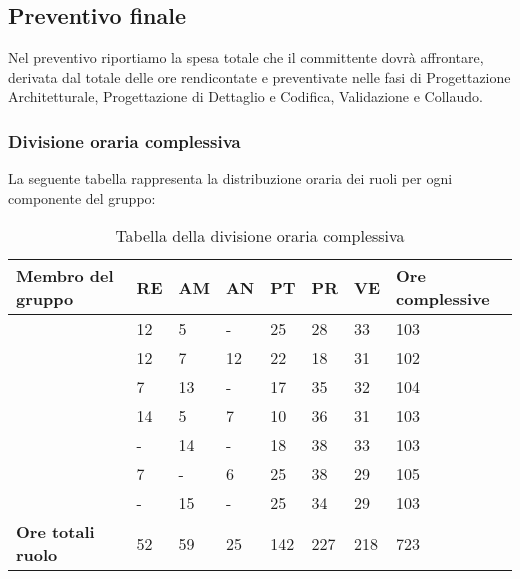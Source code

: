 \subsection{Preventivo finale} 
Nel preventivo riportiamo la spesa totale che il committente dovrà affrontare, derivata dal totale delle ore rendicontate e preventivate nelle fasi di Progettazione Architetturale, Progettazione di Dettaglio e Codifica, Validazione e Collaudo.

\subsubsection{Divisione oraria complessiva} 
La seguente tabella rappresenta la distribuzione oraria dei ruoli per ogni componente del gruppo:
{
\renewcommand{\arraystretch}{2}
\begin{longtable}[h!] { C{4cm} C{1cm} C{1cm} C{1cm} C{1cm} C{1cm} C{1cm} C{3cm}}
\caption{Tabella della divisione oraria complessiva}	\\
\rowcolor{\primaryColor}

\textcolor{\secondaryColor}{\textbf{Membro del gruppo}} & 
\textcolor{\secondaryColor}{\textbf{RE}} & 
\textcolor{\secondaryColor}{\textbf{AM}} & 
\textcolor{\secondaryColor}{\textbf{AN}} & 
\textcolor{\secondaryColor}{\textbf{PT}} & 
\textcolor{\secondaryColor}{\textbf{PR}} & 
\textcolor{\secondaryColor}{\textbf{VE}} & 
\textcolor{\secondaryColor}{\textbf{Ore complessive}}\\	
\endhead

\AW{}                     &  12 & 5 & - & 25 & 28 & 33 & 103 \\
\AT{}                     &  12 &  7 & 12 & 22 & 18 & 31 & 102 \\
\AD{}                     &  7 &  13 & - & 17 & 35 & 32 & 104 \\
\EC{}                     &  14 &  5 &  7 & 10 & 36 & 31 & 103 \\
\EM{}                     &  - & 14 &  - & 18 & 38 & 33 & 103 \\
\FP{}                     &  7 &  - &  6 & 25 & 38 & 29 & 105 \\
\GG{}                     &  - &  15& - & 25 & 34 & 29 & 103 \\
\textbf{Ore totali ruolo} & 52 & 59 & 25 & 142 & 227 & 218 & 723 \\
\end{longtable}
}


